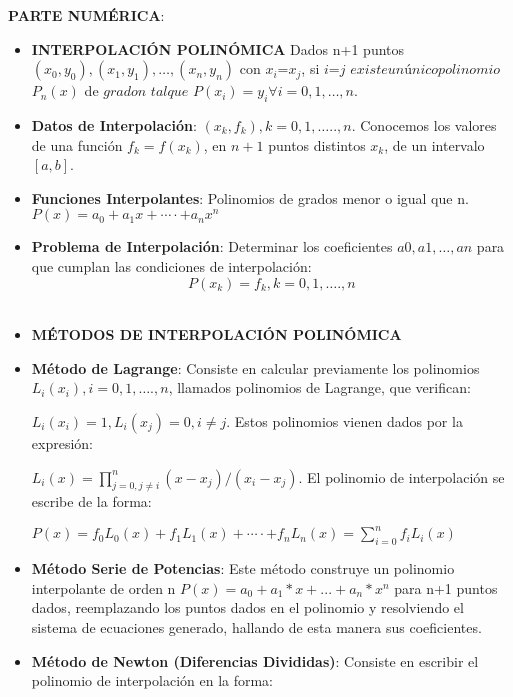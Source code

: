 \documentclass[10pt,a4paper]{article}
\begin{document}
\begin{multicols}{2}
\begin{itemize}
\end{itemize}
\noindent \textbf{PARTE NUMÉRICA}:	
\begin{itemize}
	\item \textbf{INTERPOLACIÓN POLINÓMICA}
	Dados n+1 puntos $(x_0,y_0), (x_1,y_1), … , (x_n,y_n)$ con $x_i$\not=$x_j$, si $i$\not=$j$ $ existe un único polinomio $ $P_n (x)$ de $grado $\leq$ n$ $ tal que $ $P(x_i )=y_i  \forall i=0,1,…,n$.
	\item \textbf{Datos de Interpolación}: 
	${(x_k,f_k )} $$, k=0,1,…..,n$.
	Conocemos los valores de una función $f_k=f(x_k)$, en $n+1$ puntos distintos $x_k$, de un intervalo $[a,b]$.
	
	\item \textbf{Funciones Interpolantes}: Polinomios de grados menor o igual que n.
	$P(x)=a_0+a_1 x+⋯⋅+a_n x^n$

	\item \textbf{Problema de Interpolación}: Determinar los coeficientes $a0, a1,…, an$ para que cumplan las condiciones de interpolación: \[P(x_k )= f_k,k=0,1,….,n\]\\

	\item \textbf{MÉTODOS DE INTERPOLACIÓN POLINÓMICA}

	\item \textbf{Método de Lagrange}:
	Consiste en calcular previamente los polinomios  $L_i (x_i ),i=0,1,….,n$, llamados polinomios de Lagrange, que verifican:

	$L_i (x_i )=1,L_i (x_j )=0,i\not=j$.
	Estos polinomios vienen dados por la expresión:

	$L_i (x)=\prod_{j=0,j\not=i}^{n}(x-x_j)/(x_i-x_j )$.
	El polinomio de interpolación se escribe de la forma:
	
	$ P(x)=f_0 L_0 (x)+f_1 L_1 (x)+⋯⋅+f_n L_n (x)=\sum_{i=0}^{n}f_i L_i (x) $
	
	\item \textbf{Método Serie de Potencias}:
	Este método construye un polinomio interpolante de orden n $P(x)=a_0+a_1*x+...+a_n*x^n $ para n+1 puntos dados, reemplazando los puntos dados en el polinomio y resolviendo el sistema de ecuaciones generado, hallando de esta manera sus coeficientes.
	
	\item \textbf{Método de Newton (Diferencias Divididas)}:
	Consiste en escribir el polinomio de interpolación en la forma:
	

\end{itemize}
\end{multicols}
\end{document}
